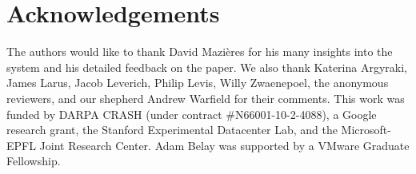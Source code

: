 
\section*{Acknowledgements}

The authors would like to thank David Mazi{\`e}res for his many
insights into the system and his detailed feedback on the paper. We
also thank Katerina Argyraki, James Larus, Jacob Leverich, Philip
Levis, Willy Zwaenepoel, the anonymous reviewers, and our shepherd
Andrew Warfield for their comments.  This work was funded by DARPA
CRASH (under contract \#N66001-10-2-4088), a Google research grant,
the Stanford Experimental Datacenter Lab, and the Microsoft-EPFL Joint
Research Center. Adam Belay was supported by a VMware Graduate
Fellowship.

